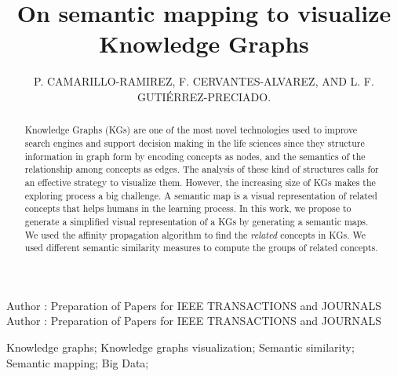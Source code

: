 \documentclass{ieeeaccess}
\begin{document}

\title{On semantic mapping to visualize Knowledge Graphs}
\author{\uppercase{P. Camarillo-Ramirez},
\uppercase{F. Cervantes-Alvarez, and L. F. Guti\'{e}rrez-Preciado}.}
\address[1]{Western Institute of Technology and Higher Education, Tlaquepaque, Jalisco 45601 Mexico (ng724453@iteso.mx;fcervantes@iteso.mx;lgutierrez@iteso.mx)}


\markboth
{Author \headeretal: Preparation of Papers for IEEE TRANSACTIONS and JOURNALS}
{Author \headeretal: Preparation of Papers for IEEE TRANSACTIONS and JOURNALS}


\begin{abstract}
Knowledge Graphs (KGs) are one of the most novel technologies used to
improve search engines and support
decision making in the life sciences since they structure information in graph form
by encoding concepts as nodes, and the semantics of the relationship
among concepts as edges. The analysis of these kind of structures calls
for an effective strategy to visualize them. However, the increasing
size of KGs makes the exploring process a big challenge.
A semantic map is a visual representation of related concepts that helps humans
in the learning process. In this work, we propose to generate a simplified visual
representation of a KGs by generating a semantic maps. We used the affinity propagation
algorithm to find the \textit{related} concepts in KGs. We used different semantic similarity
measures to compute the groups of related concepts.


\end{abstract}

\begin{keywords}
Knowledge graphs; Knowledge graphs visualization; Semantic similarity; Semantic mapping; Big Data;
\end{keywords}

\titlepgskip=-15pt

\maketitle
\end{document}
